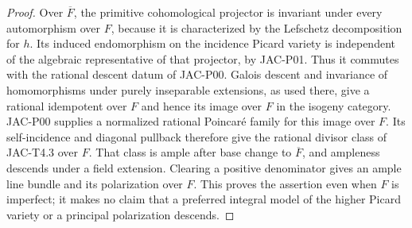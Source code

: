 \begin{proof}
Over $\overline F$, the primitive cohomological projector is invariant
under every automorphism over $F$, because it is characterized by the
Lefschetz decomposition for $h$. Its induced endomorphism on the
incidence Picard variety is independent of the algebraic representative
of that projector, by JAC-P01. Thus it commutes with the rational
descent datum of JAC-P00. Galois descent and invariance of homomorphisms
under purely inseparable extensions, as used there, give a rational
idempotent over $F$ and hence its image over $F$ in the isogeny category.
JAC-P00 supplies a normalized rational Poincar\'e family for this image
over $F$. Its self-incidence and diagonal pullback therefore give the
rational divisor class of JAC-T4.3 over $F$. That class is ample after
base change to $\overline F$, and ampleness descends under a field
extension. Clearing a positive denominator gives an ample line bundle
and its polarization over $F$. This proves the assertion even when
$F$ is imperfect; it makes no claim that a preferred integral model of
the higher Picard variety or a principal polarization descends.
\end{proof}
